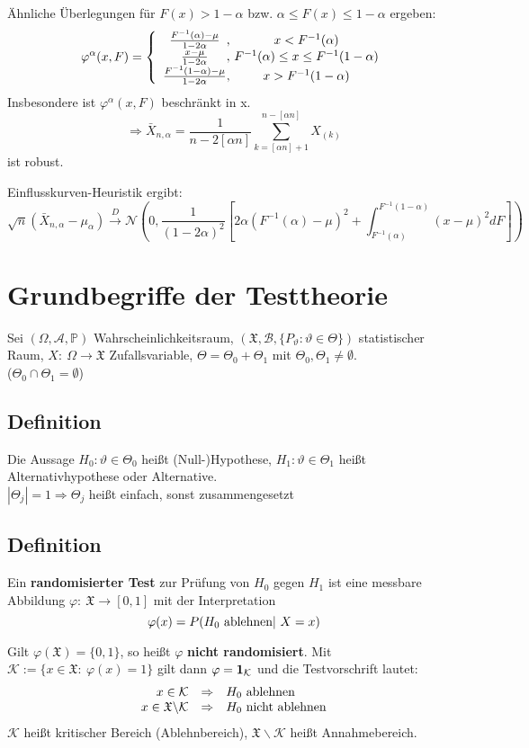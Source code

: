 \documentclass[a4paper,11pt,twoside,titlepage]{article}
\newcommand{\PP}{{\mathbb P}} %
\newcommand{\XX}{{\mathfrak X}} %
\newcommand{\K}{{\mathcal K}}
\newcommand\AAA{ \mathcal{A} } %
\newcommand\BB{ \mathcal{B} } %
\newcommand\NN{ \mathcal{N} } %
\newcommand{\ind}{\text{\bf{1}}} %
\begin{document}
Ähnliche Überlegungen für $F(x)>1-\alpha$ bzw. $\alpha\leq F(x)\leq 1-\alpha$ ergeben:
\[\varphi^\alpha(x,F)=\left\{\begin{array}{c@{,\ }c}\frac{F^{-1}(\alpha)-\mu}{1-2\alpha}&x<F^{-1}(\alpha)\\ \frac{x-\mu}{1-2\alpha}&F^{-1}(\alpha)\leq x\leq F^{-1}(1-\alpha)\\\frac{F^{-1}(1-\alpha)-\mu}{1-2\alpha}&x>F^{-1}(1-\alpha)\end{array}\right.\]
Insbesondere ist $\varphi^\alpha(x,F)$ beschränkt in x.
\[\Rightarrow \bar X_{n,\alpha}=\frac{1}{n-2[\alpha n]}\sum_{k=[\alpha n]+1}^{n-[\alpha n]}X_{(k)}\]
ist robust.

Einflusskurven-Heuristik ergibt:
\[\sqrt{n}(\bar X_{n,\alpha}-\mu_\alpha)\stackrel{D}{\to}\NN\left(0,\frac{1}{(1-2\alpha)^2}[2\alpha(F^{-1}(\alpha)-\mu)^2+\int_{F^{-1}(\alpha)}^{F^{-1}(1-\alpha)}(x-\mu)^2dF]\right)\]

\cleardoublepage
\section{Grundbegriffe der Testtheorie}
Sei $(\Omega,\AAA,\PP)$ Wahrscheinlichkeitsraum,  $(\XX,\BB,\{P_\vartheta:\vartheta\in\Theta\})$ statistischer Raum, $X:\ \Omega\to\XX$ Zufallsvariable, $\Theta=\Theta_0+\Theta_1$ mit $\Theta_0,\Theta_1\neq\emptyset$.\\ ($\Theta_0\cap\Theta_1=\emptyset$)

\subsection{Definition}
Die Aussage $H_0: \vartheta\in\Theta_0$ heißt (Null-)Hypothese, $H_1: \vartheta\in\Theta_1$ heißt Alternativhypothese oder Alternative.\\
$|\Theta_j|=1\Rightarrow\Theta_j$ heißt einfach, sonst zusammengesetzt

\subsection{Definition}
Ein \textbf{randomisierter Test} zur Prüfung von $H_0$ gegen $H_1$ ist eine messbare Abbildung $\varphi:\ \XX\to[0,1]$ mit der Interpretation
\[\varphi(x)=P(H_0\textnormal{ ablehnen}|\ X=x)\]

Gilt $\varphi(\XX)=\{0,1\}$, so heißt $\varphi$ \textbf{nicht randomisiert}. Mit $\K:=\{x\in\XX:\ \varphi(x)=1\}$ gilt dann $\varphi=\ind_\K$ und die Testvorschrift lautet:
\[\begin{array}{rcl}x\in\K&\Rightarrow&H_0\textnormal{ ablehnen}\\
x\in\XX\backslash\K&\Rightarrow&H_0\textnormal{ nicht ablehnen}\end{array}\]
$\K$ heißt kritischer Bereich (Ablehnbereich), $\XX\backslash\K$ heißt Annahmebereich.
\end{document}
